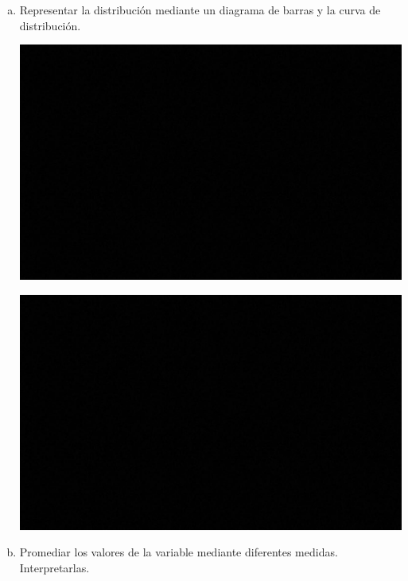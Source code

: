 \documentclass[]{article}
\begin{document}
\begin{enumerate}[{Ejercicio} 1.]
\begin{enumerate}[a)]
	 		\item Representar la distribución mediante un diagrama de barras y la curva de distribución.
	 		
	 		\begin{minipage}[t]{.45\linewidth}
	 			\raggedleft
	 			\vspace*{0pt}
	 			\begin{center}
	 				\includegraphics[scale = 0.15]{prueba}
	 			\end{center}
	 		\end{minipage}%
	 		\begin{minipage}[t]{.45\linewidth}
	 			\vspace*{0pt}
	 			\raggedleft
	 			\begin{center}
	 				\includegraphics[scale = 0.15]{prueba}
	 			\end{center}
	 		\end{minipage}
 		
 			\item Promediar los valores de la variable mediante diferentes medidas. Interpretarlas.
 			

\end{enumerate}
\end{enumerate}
\end{document}
